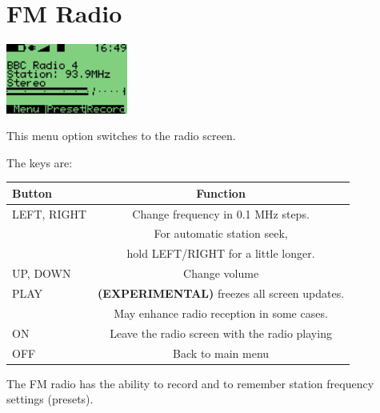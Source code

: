 \section{\label{ref:FMradio}FM Radio}
\begin{center}
  \includegraphics[width=4cm]{main_menu/images/ss-fm-radio-screen-112x64x1.png}
\end{center}
This menu option switches to the radio screen. 

The keys are:

\begin{table}[h!]
  \begin{center}
    \begin{tabular}{@{}lc@{}}\toprule
      \textbf{Button} & \textbf{Function} \\\midrule
      LEFT, RIGHT & Change frequency in 0.1 MHz steps. \\
      & For automatic station seek, \\
      & hold LEFT/RIGHT for a little longer. \\
      UP, DOWN & Change volume \\
      PLAY & \textbf{(EXPERIMENTAL)} freezes all screen updates.\\
      & May enhance radio reception in some cases. \\
      ON & Leave the radio screen with the radio playing \\
      OFF & Back to main menu \\\bottomrule
    \end{tabular}
  \end{center}
\end{table}
The FM radio has the ability to record and to remember station frequency settings (presets).

